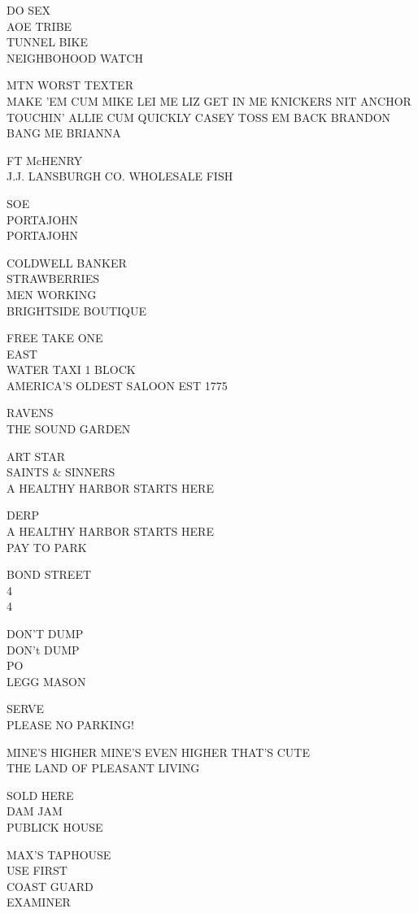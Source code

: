\documentclass[10pt,letterpaper]{article}
\begin{document}
DO SEX\\
AOE TRIBE\\
TUNNEL BIKE\\
NEIGHBOHOOD WATCH

MTN WORST TEXTER\\
MAKE 'EM CUM MIKE LEI ME LIZ GET IN ME KNICKERS NIT ANCHOR TOUCHIN' ALLIE CUM QUICKLY CASEY TOSS EM BACK BRANDON BANG ME BRIANNA

FT McHENRY\\
J.J. LANSBURGH CO. WHOLESALE FISH

SOE\\
PORTAJOHN\\
PORTAJOHN

COLDWELL BANKER\\
STRAWBERRIES\\
MEN WORKING\\
BRIGHTSIDE BOUTIQUE

FREE TAKE ONE\\
EAST\\
WATER TAXI 1 BLOCK\\
AMERICA'S OLDEST SALOON EST 1775

RAVENS\\
THE SOUND GARDEN

ART STAR\\
SAINTS \& SINNERS\\
A HEALTHY HARBOR STARTS HERE

DERP\\
A HEALTHY HARBOR STARTS HERE\\
PAY TO PARK

BOND STREET\\
4\\
4

DON'T DUMP\\
DON't DUMP\\
PO\\
LEGG MASON

SERVE\\
PLEASE NO PARKING!

MINE'S HIGHER MINE'S EVEN HIGHER THAT'S CUTE\\
THE LAND OF PLEASANT LIVING

SOLD HERE\\
DAM JAM\\
PUBLICK HOUSE

MAX'S TAPHOUSE\\
USE FIRST\\
COAST GUARD\\
EXAMINER
\end{document}

